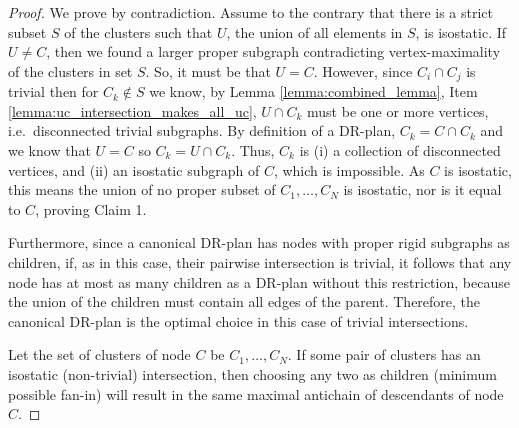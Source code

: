 \begin{proof}
    We prove by contradiction.
    Assume to the contrary that there is a strict subset $S$ of the clusters such that $U$, the union of all elements in $S$, is isostatic. If $U\neq C$, then we found a larger proper subgraph contradicting vertex-maximality of the clusters in set $S$. So, it must be that $U=C$.
    \usestwod
    However, since $C_i \cap C_j$ is trivial then for $C_k\notin S$ we know, by Lemma \ref{lemma:combined_lemma}, Item \ref{lemma:uc_intersection_makes_all_uc}, $U\cap C_k$ must be one or more vertices, i.e.\ disconnected trivial subgraphs. By definition of a DR-plan, $C_k=C\cap C_k$ and we know that $U=C$ so $C_k=U\cap C_k$. Thus, $C_k$ is (i) a collection of disconnected vertices, and (ii) an isostatic subgraph of $C$, which is impossible. As $C$ is isostatic, this means the union of no proper subset of $C_1,\ldots,C_N$ is isostatic, nor is it equal to $C$, proving Claim 1.

    Furthermore, since a canonical DR-plan has nodes with proper rigid  subgraphs as children, if, as in this case, their pairwise intersection is trivial, it follows that any node has at most as many children as a DR-plan without this restriction, because the union of the children must contain all edges of the parent. Therefore, the canonical DR-plan is the optimal choice in this case of trivial intersections.

    \medskip\noindent
    Let the set of clusters of node $C$ be $C_1,\ldots,C_N$. If some pair of clusters
    has an isostatic (non-trivial) intersection, then choosing any two as children (minimum possible fan-in) will result in the same maximal antichain of descendants of node $C$.


\end{proof}
